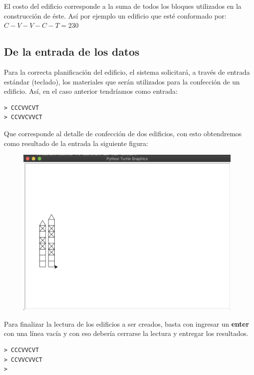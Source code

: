 \documentclass[]{article}
\begin{document}
    El costo del edificio corresponde a la suma de todos los bloques utilizados en la construcción de éste. Así por ejemplo un edificio que esté conformado por: \(C - V - V - C - T = 230 \)

    \subsection{De la entrada de los datos}
    Para la correcta planificación del edificio, el sistema solicitará, a través de entrada estándar (teclado), los materiales que serán utilizados para la confección de un edificio. Así, en el caso anterior tendríamos como entrada:\\

    \begin{verbatim}
> CCCVVCVT
> CCVVCVVCT
    \end{verbatim}

    Que corresponde al detalle de confección de dos edificios, con esto obtendremos como resultado de la entrada la siguiente figura:

    \begin{figure}[H]
        \includegraphics[scale=0.5]{first-input}
    \end{figure}

    Para finalizar la lectura de los edificios a ser creados, basta con ingresar un \textbf{enter} con una línea vacía y con eso debería cerrarse la lectura y entregar los resultados.\\

    \begin{verbatim}
> CCCVVCVT
> CCVVCVVCT
> 
    \end{verbatim}
\end{document}
